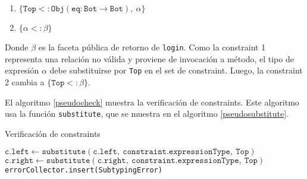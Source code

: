 \begin{enumerate}
  \item $\{\mathtt{Top <: Obj(eq: Bot \rightarrow Bot),\ \alpha}\}$
  \item $\{\mathtt{\alpha <: \beta}\}$
\end{enumerate}

Donde $\beta$ es la faceta pública de retorno de \texttt{login}. Como la constraint 1 representa una relación no válida y proviene de invocación a método, el tipo de expresión $\alpha$ debe substituirse por \texttt{Top} en el set de constraint. Luego, la constraint 2 cambia a $\{\mathtt{Top <: \beta}\}$.

El algoritmo \ref{pseudocheck} muestra la verificación de constraints. Este algoritmo usa la función \texttt{substitute}, que se muestra en el algoritmo \ref{pseudosubstitute}.

\begin{algorithm}\captionsetup{labelsep=newline}
  \centering
  \caption{Verificación de constraints}
  \label{pseudocheck}
    \begin{algorithmic}[1]
                \State $\mathtt{c.left\gets substitute(c.left,\ constraint.expressionType,\ Top)}$
                \State $\mathtt{c.right\gets substitute(c.right,\ constraint.expressionType,\ Top)}$
              \EndFor
              \State \texttt{errorCollector.insert(SubtypingError)}
            \EndIf
          \EndFor
      \EndFunction
    \end{algorithmic}
\end{algorithm}

